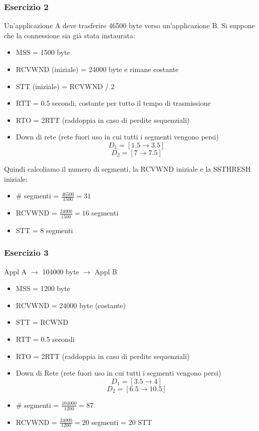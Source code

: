 \documentclass[a4paper]{article}
\begin{document}
\subsubsection{Esercizio 2}

Un'applicazione A deve trasferire 46500 byte verso un'applicazione B. Si suppone che la connessione sia già stata instaurata:
\begin{itemize}
    \item MSS = 1500 byte
    \item RCVWND (iniziale) = 24000 byte e rimane costante 
    \item STT (iniziale) = RCVWND / 2
    \item RTT = 0.5 secondi, costante per tutto il tempo di trasmissione
    \item RTO = 2RTT (raddoppia in caso di perdite sequenziali)
    \item Down di rete (rete fuori uso in cui tutti i segmenti vengono persi)
    \[D_1 = [1.5 \rightarrow 3.5]\]
    \[D_2 = [7 \rightarrow 7.5]\]
\end{itemize}
Quindi calcoliamo il numero di segmenti, la RCVWND iniziale e la SSTHRESH iniziale:
\begin{itemize}
    \item \# segmenti = $\frac{46500}{1500} = 31$ 
    \item RCVWND = $\frac{24000}{1500} = 16$ segmenti
    \item STT = 8 segmenti
\end{itemize}

\subsubsection{Esercizio 3}
Appl A $\rightarrow$ 104000 byte $\rightarrow$ Appl B
\begin{itemize}
    \item MSS = 1200 byte
    \item RCVWND = 24000 byte (costante)
    \item STT = RCWND
    \item RTT = 0.5 secondi
    \item RTO = 2RTT (raddoppia in caso di perdite sequenziali)
    \item Down di Rete (rete fuori uso in cui tutti i segmenti vengono persi)
    \[D_1 = [3.5 \rightarrow 4]\]
    \[D_2 = [6.5 \rightarrow 10.5]\]
\end{itemize}

\begin{itemize}
    \item \# segmenti = $\frac{104000}{1200} = 87$
    \item RCVWND = $\frac{24000}{1200} = 20$ segmenti = 20 STT
\end{itemize}
\end{document}
